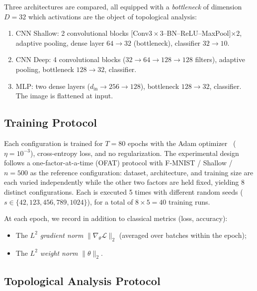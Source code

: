 \documentclass[11pt,a4paper]{article}
\begin{document}
Three architectures are compared, all equipped with a \emph{bottleneck}
of dimension $D = 32$ which activations are the object of topological
analysis:

\begin{enumerate}
  \item CNN Shallow: 2 convolutional blocks
  [Conv$3\!\times\!3$--BN--ReLU--MaxPool]$\times 2$, adaptive pooling,
  dense layer $64 \to 32$ (bottleneck), classifier $32 \to 10$.

  \item CNN Deep: 4 convolutional blocks ($32 \to 64 \to 128
  \to 128$ filters), adaptive pooling, bottleneck $128 \to 32$,
  classifier.

  \item MLP: two dense layers ($d_{\mathrm{in}} \to 256
  \to 128$), bottleneck $128 \to 32$, classifier. The image is
  flattened at input.
\end{enumerate}

\subsection{Training Protocol}
\label{subsec:entrainement}

Each configuration is trained for $T = 80$ epochs with the Adam
optimizer~\cite{kingma2017adammethodstochasticoptimization} ($\eta = 10^{-3}$), cross-entropy loss,
and no regularization. The experimental design follows a one-factor-at-a-time
(OFAT) protocol with F-MNIST / Shallow / $n=500$ as the reference
configuration: dataset, architecture, and training size are each varied
independently while the other two factors are held fixed, yielding 8
distinct configurations. Each is executed 5 times with different random
seeds ($s \in \{42, 123, 456, 789, 1024\}$), for a total of
$8 \times 5 = 40$ training runs.

At each epoch, we record in addition to classical metrics (loss, accuracy):
\begin{itemize}
  \item The \emph{$L^2$ gradient norm} $\|\nabla_\theta \mathcal{L}\|_2$
  (averaged over batches within the epoch);
  \item The \emph{$L^2$ weight norm} $\|\theta\|_2$.
\end{itemize}

\subsection{Topological Analysis Protocol}
\label{subsec:protocole_tda}
\end{document}
